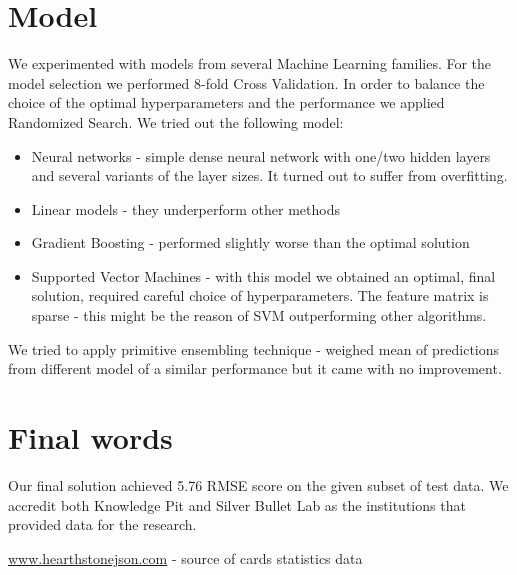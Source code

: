\documentclass[a4paper]{article}
\begin{document}
\section{Model}
We experimented with models from several Machine Learning families.
For the model selection we performed 8-fold Cross Validation. 
In order to balance the choice of the optimal hyperparameters and the performance we applied Randomized Search.
We tried out the following model:
\begin{itemize}
\item Neural networks - simple dense neural network with one/two hidden layers and several variants of the layer sizes. It turned out to suffer from overfitting.
\item Linear models - they underperform other methods
\item Gradient Boosting - performed slightly worse than the optimal solution
\item Supported Vector Machines - with this model we obtained an optimal, final solution, required careful choice of hyperparameters.
The feature matrix is sparse - this might be the reason of SVM outperforming other algorithms.
\end{itemize}



We tried to apply primitive ensembling technique - weighed mean of predictions from different model of a similar performance but it came with no improvement.

\section{Final words}
Our final solution achieved 5.76 RMSE score on the given subset of test data. We accredit both Knowledge Pit and Silver Bullet Lab as the institutions that provided data for the research.

\begin{thebibliography}{9}
 \url{www.hearthstonejson.com} - source of cards statistics data



\end{thebibliography}
\end{document}
